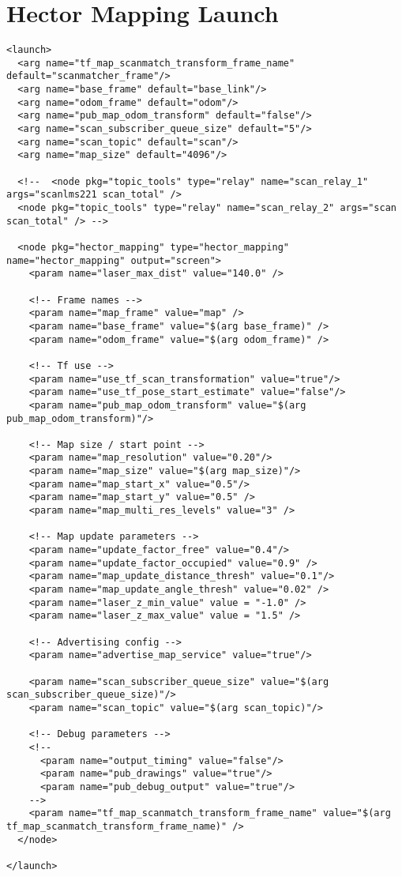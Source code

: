 \section*{Hector Mapping Launch}
\begin{lstlisting}[breaklines=true,basicstyle=\tiny]
<launch>
  <arg name="tf_map_scanmatch_transform_frame_name" default="scanmatcher_frame"/>
  <arg name="base_frame" default="base_link"/>
  <arg name="odom_frame" default="odom"/>
  <arg name="pub_map_odom_transform" default="false"/>
  <arg name="scan_subscriber_queue_size" default="5"/>
  <arg name="scan_topic" default="scan"/>
  <arg name="map_size" default="4096"/>

  <!--  <node pkg="topic_tools" type="relay" name="scan_relay_1" args="scanlms221 scan_total" />
  <node pkg="topic_tools" type="relay" name="scan_relay_2" args="scan scan_total" /> -->
  
  <node pkg="hector_mapping" type="hector_mapping" name="hector_mapping" output="screen">
    <param name="laser_max_dist" value="140.0" />
    
    <!-- Frame names -->
    <param name="map_frame" value="map" />
    <param name="base_frame" value="$(arg base_frame)" />
    <param name="odom_frame" value="$(arg odom_frame)" />
    
    <!-- Tf use -->
    <param name="use_tf_scan_transformation" value="true"/>
    <param name="use_tf_pose_start_estimate" value="false"/>
    <param name="pub_map_odom_transform" value="$(arg pub_map_odom_transform)"/>
    
    <!-- Map size / start point -->
    <param name="map_resolution" value="0.20"/>
    <param name="map_size" value="$(arg map_size)"/>
    <param name="map_start_x" value="0.5"/>
    <param name="map_start_y" value="0.5" />
    <param name="map_multi_res_levels" value="3" />
    
    <!-- Map update parameters -->
    <param name="update_factor_free" value="0.4"/>
    <param name="update_factor_occupied" value="0.9" />    
    <param name="map_update_distance_thresh" value="0.1"/>
    <param name="map_update_angle_thresh" value="0.02" />
    <param name="laser_z_min_value" value = "-1.0" />
    <param name="laser_z_max_value" value = "1.5" />
    
    <!-- Advertising config --> 
    <param name="advertise_map_service" value="true"/>
    
    <param name="scan_subscriber_queue_size" value="$(arg scan_subscriber_queue_size)"/>
    <param name="scan_topic" value="$(arg scan_topic)"/>
    
    <!-- Debug parameters -->
    <!--
      <param name="output_timing" value="false"/>
      <param name="pub_drawings" value="true"/>
      <param name="pub_debug_output" value="true"/>
    -->
    <param name="tf_map_scanmatch_transform_frame_name" value="$(arg tf_map_scanmatch_transform_frame_name)" />
  </node>
    
</launch>
  
\end{lstlisting}


